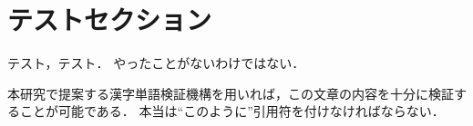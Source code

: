 \section{テストセクション}

テスト，テスト．
やったことがないわけではない．

本研究で提案する漢字単語検証機構を用いれば，この文章の内容を十分に検証することが可能である．
本当は``このように''引用符を付けなければならない．

